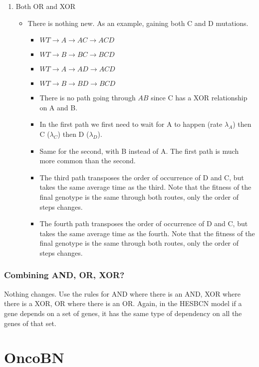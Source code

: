 \documentclass[11pt]{article}
\begin{document}
\begin{enumerate}
\item Both OR and XOR
\label{sec:org5edd44b}
\begin{itemize}
\item There is nothing new. As an example, gaining both C and D mutations.
\begin{itemize}
\item \(WT \rightarrow A \rightarrow AC \rightarrow ACD\)
\item \(WT \rightarrow B \rightarrow BC \rightarrow BCD\)
\item \(WT \rightarrow A \rightarrow AD \rightarrow ACD\)
\item \(WT \rightarrow B \rightarrow BD \rightarrow BCD\)
\item There is no path going through \(AB\) since C has a XOR relationship on A and B.

\item In the first path we first need to wait for A to happen (rate \(\lambda_A\)) then C (\(\lambda_C\)) then D (\(\lambda_D\)).
\item Same for the second, with B instead of A. The first path is much more common than the second.
\item The third path transposes the order of occurrence of D and C, but takes the same average time as the third. Note that the fitness of the final genotype is the same through both routes, only the order of steps changes.
\item The fourth path transposes the order of occurrence of D and C, but takes the same average time as the fourth. Note that the fitness of the final genotype is the same through both routes, only the order of steps changes.
\end{itemize}
\end{itemize}
\end{enumerate}

\subsubsection{Combining AND, OR, XOR?}
\label{sec:org78cffb2}
Nothing changes. Use the rules for AND where there is an AND, XOR where there is a XOR, OR where there is an OR. Again, in the HESBCN model if a gene depends on a set of genes, it has the same type of dependency on all the genes of that set.


\section{OncoBN}\label{oncobn}
\end{document}
